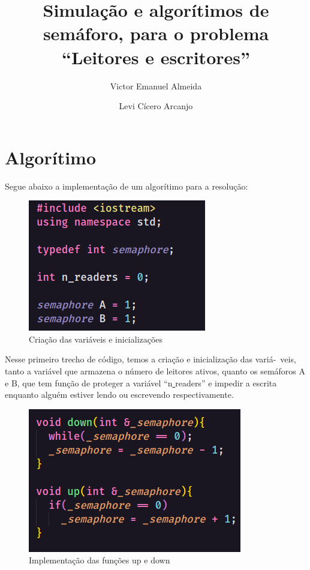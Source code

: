 \documentclass[12pt, a4paper]{article}
\author{Victor Emanuel Almeida \and Levi Cícero Arcanjo}
\title{Simulação e algorítimos de semáforo, para o problema ``Leitores e escritores''}
\begin{document}
\begin{titlepage}
\maketitle\thispagestyle{empty}
\end{titlepage}

\section{Algorítimo}

Segue abaixo a implementação de um algorítimo para a resolução:

\begin{figure}[!htb]
	\centering
	\includegraphics[keepaspectratio]{1.png}
	\caption{\label{fig:1.png} Criação das variáveis e inicializações}
\end{figure}

Nesse primeiro trecho de código, temos a criação e inicialização das variá-~veis, tanto a variável que armazena o número de leitores ativos, quanto os semáforos A e B, que tem função de proteger a variável ``n\underline{ }readers'' e impedir a escrita enquanto alguém estiver lendo ou escrevendo respectivamente.\\

\begin{figure}[!htb]
	\centering
	\includegraphics[keepaspectratio, scale=.83]{2.png}
	\caption{\label{fig:2.png} Implementação das funções up e down}
\end{figure}
\end{document}
